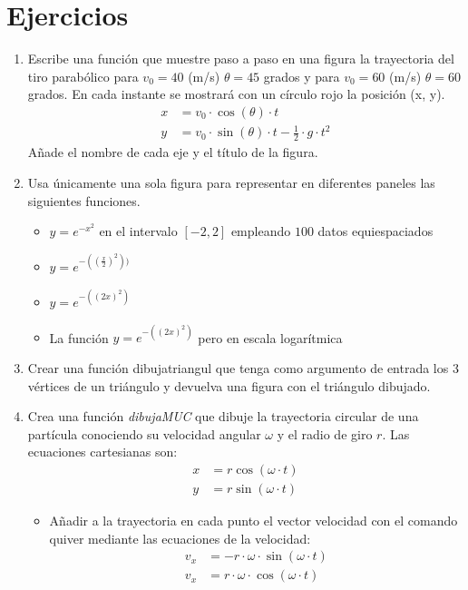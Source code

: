 \section{Ejercicios}
\begin{enumerate}
    \item  Escribe una función que muestre paso a paso en una figura la trayectoria del tiro parabólico para $v_0=40$ (m/s) $\theta=45 $ grados  y para $v_0=60$ (m/s) $\theta=60 $ grados. En cada instante se mostrará con un círculo rojo la posición (x, y). 
\begin{align*}
    x&=v_0 \cdot \cos(\theta) \cdot t \\
    y&=v_0 \cdot \sin(\theta) \cdot t -\frac{1}{2}\cdot g \cdot t^2
\end{align*}
Añade el nombre de cada eje y el título de la figura.

\item Usa únicamente una sola figura para representar en diferentes paneles las siguientes funciones. 
\begin{itemize}
    \item $y=e^{-x^2}$ en el intervalo $[-2,2]$ empleando $100$ datos equiespaciados
    \item $y=e^{-((\frac{x}{2})^2))}$
    \item $y=e^{-((2x)^2)}$
    \item La función $y=e^{-((2x)^2)}$ pero en escala logarítmica
\end{itemize}

\item Crear una función dibujatriangul que tenga como argumento de entrada los 3 vértices de un triángulo y devuelva una figura con el triángulo dibujado.
\item Crea una función \emph{dibujaMUC} que dibuje la trayectoria circular de una partícula conociendo su velocidad angular $\omega$ y el radio de giro $r$. 
Las ecuaciones cartesianas son:
\begin{align*}
    x&=r\cos(\omega \cdot t)\\
    y&=r\sin (\omega \cdot t)
\end{align*}
\begin{itemize}
    \item Añadir a la trayectoria en cada punto el vector velocidad con el comando quiver mediante las ecuaciones de la velocidad:
    \begin{align*}
        v_x&=-r\cdot \omega \cdot \sin(\omega \cdot t)\\
        v_x&=r\cdot \omega \cdot \cos(\omega \cdot t)
    \end{align*}
\end{itemize}


\end{enumerate}

